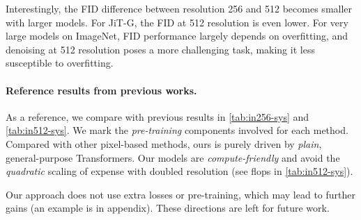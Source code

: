 Interestingly, the FID difference between resolution 256 and 512 becomes smaller with larger models. For JiT-G, the FID at 512 resolution is even lower. For very large models on ImageNet, FID performance largely depends on overfitting, and denoising at 512 resolution poses a more challenging task, making it less susceptible to overfitting. 

\paragraph{Reference results from previous works.} As a reference, we compare with previous results in \cref{tab:in256-sys} and \ref{tab:in512-sys}. We mark the \textit{pre-training} components involved for each method.
Compared with other pixel-based methods, ours is purely driven by \textit{plain}, general-purpose Transformers. Our models are \textit{compute-friendly} and avoid the \textit{quadratic} scaling of expense with doubled resolution  (see flops in \cref{tab:in512-sys}).

Our approach does not use extra losses or pre-training, which may lead to further gains (an example is in appendix). These directions are left for future work.


